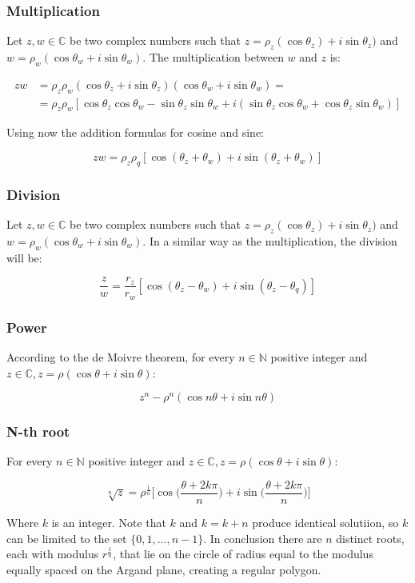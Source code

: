 		\subsubsection{Multiplication}
		Let $z, w\in\mathbb{C}$ be two complex numbers such that $z = \rho_z(\cos\theta_z) + i\sin\theta_z)$ and $w = \rho_w(\cos\theta_w + i\sin\theta_w)$.
		The multiplication between $w$ and $z$ is:

		\begin{align*}
			zw &= \rho_z\rho_w(\cos\theta_z +i \sin\theta_z)(\cos\theta_w +i \sin\theta_w) =\\
				 &= \rho_z\rho_w[\cos\theta_z\cos\theta_w - \sin\theta_z\sin\theta_w + i(\sin\theta_z\cos\theta_w + \cos\theta_z\sin\theta_w)]
		\end{align*}

		Using now the addition formulas for cosine and sine:

		$$zw = \rho_z\rho_q[\cos(\theta_z+\theta_w) + i\sin(\theta_z+\theta_w)]$$

		\subsubsection{Division}
		Let $z, w\in\mathbb{C}$ be two complex numbers such that $z = \rho_z(\cos\theta_z) + i\sin\theta_z)$ and $w = \rho_w(\cos\theta_w + i\sin\theta_w)$.
		In a similar way as the multiplication, the division will be:

		$$\frac{z}{w} = \frac{r_z}{r_w}[\cos(\theta_z-\theta_w) + i\sin(\theta_z-\theta_q)]$$

		\subsubsection{Power}
		According to the de Moivre theorem, for every $n\in\mathbb{N}$ positive integer and $z\in\mathbb{C}, z = \rho(\cos\theta + i\sin\theta)$:

		$$z^n - \rho^n(\cos n\theta + i\sin n\theta)$$

		\subsubsection{N-th root}
		For every $n\in\mathbb{N}$ positive integer and $z\in\mathbb{C}, z = \rho(\cos\theta + i\sin\theta)$:

		$$\sqrt[n]{z} = \rho^{\frac{1}{n}}\biggl[\cos\biggl(\frac{\theta+2k\pi}{n}\biggr) + i\sin\biggl(\frac{\theta+2k\pi}{n}\biggr)\biggr]$$

		Where $k$ is an integer.
		Note that $k$ and $k=k+n$ produce identical solutiion, so $k$ can be limited to the set $\{0,1,\dots, n-1\}$.
		In conclusion there are $n$ distinct roots, each with modulus $r^{\frac{1}{n}}$, that lie on the circle of radius equal to the modulus equally spaced on the Argand plane, creating a regular polygon.

